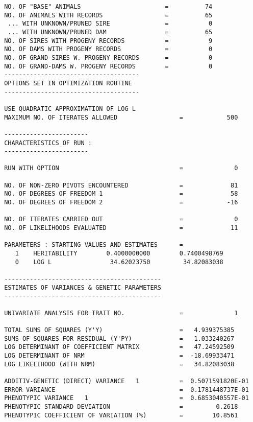 \documentclass[titlepage]{article}  %
\begin{document}
\begin{verbatim}
 NO. OF "BASE" ANIMALS                       =          74
 NO. OF ANIMALS WITH RECORDS                 =          65
  ... WITH UNKNOWN/PRUNED SIRE               =           0
  ... WITH UNKNOWN/PRUNED DAM                =          65
 NO. OF SIRES WITH PROGENY RECORDS           =           9
 NO. OF DAMS WITH PROGENY RECORDS            =           0
 NO. OF GRAND-SIRES W. PROGENY RECORDS       =           0
 NO. OF GRAND-DAMS W. PROGENY RECORDS        =           0
 -------------------------------------
 OPTIONS SET IN OPTIMIZATION ROUTINE 
 -------------------------------------
  
 USE QUADRATIC APPROXIMATION OF LOG L
 MAXIMUM NO. OF ITERATES ALLOWED                 =            500
  
 -----------------------
 CHARACTERISTICS OF RUN :
 -----------------------
  
 RUN WITH OPTION                                 =              0
  
 NO. OF NON-ZERO PIVOTS ENCOUNTERED              =             81
 NO. OF DEGREES OF FREEDOM 1                     =             58
 NO. OF DEGREES OF FREEDOM 2                     =            -16
  
 NO. OF ITERATES CARRIED OUT                     =              0
 NO. OF LIKELIHOODS EVALUATED                    =             11
  
 PARAMETERS : STARTING VALUES AND ESTIMATES      =
    1    HERITABILITY        0.4000000000        0.7400498769    
    0    LOG L                34.62023750         34.82083038    
  
 -------------------------------------------
 ESTIMATES OF VARIANCES & GENETIC PARAMETERS
 -------------------------------------------
  
 UNIVARIATE ANALYSIS FOR TRAIT NO.               =              1
  
 TOTAL SUMS OF SQUARES (Y'Y)                     =   4.939375385    
 SUMS OF SQUARES FOR RESIDUAL (Y'PY)             =   1.033240267    
 LOG DETERMINANT OF COEFFICIENT MATRIX           =   47.24592509    
 LOG DETERMINANT OF NRM                          =  -18.69933471    
 LOG LIKELIHOOD (WITH NRM)                       =   34.82083038    
  
 ADDITIV-GENETIC (DIRECT) VARIANCE   1           =  0.5071591820E-01
 ERROR VARIANCE                                  =  0.1781448737E-01
 PHENOTYPIC VARIANCE   1                         =  0.6853040557E-01
 PHENOTYPIC STANDARD DEVIATION                   =         0.2618
 PHENOTYPIC COEFFICIENT OF VARIATION (%)         =        10.8561
  

\end{verbatim}
\end{document}
